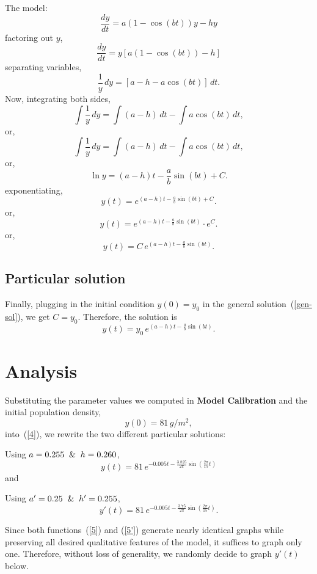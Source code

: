 \documentclass[11pt]{article}
\begin{document}
The model:
\[
\frac{dy}{dt} = a(1 - \cos(bt))y - hy
\]
factoring out $y$,
\[
\frac{dy}{dt} = y[a(1 - \cos(bt)) - h]
\]
separating variables,
\[
\frac{1}{y}\, dy = [a - h - a\cos(bt)]\, dt .
\]
Now, integrating both sides,
\[
\int \frac{1}{y}\, dy = \int (a-h)\,dt - \int a\cos(bt)\,dt,
\]
or,
\[
\int \frac{1}{y}\, dy = \int (a-h)\,dt - \int a\cos(bt)\, dt,
\]
or,
\[
\ln y = (a-h)t - \frac{a}{b}\sin(bt) + C.
\]
exponentiating,
\[
y(t)=e^{(a-h)t-\frac{a}{b}\sin(bt)+C}.
\]
or,
\[
y(t)=e^{(a-h)t-\frac{a}{b}\sin(bt)} \cdot e^C.
\]
or,
\begin{equation}
    y(t)=C\,e^{(a-h)t-\frac{a}{b}\sin(bt)}.
    \label{3}
    \tag{3}
\end{equation}

\subsection{Particular solution}

Finally, plugging in the initial condition $y(0)=y_0$ in the general solution~(\ref{gen-sol}), we get $C=y_0$. Therefore, the solution is
\begin{equation}
    y(t)=y_0\,e^{(a-h)t-\frac{a}{b}\sin(bt)}.
    \label{4}
    \tag{4}
\end{equation}

\section{Analysis}

Substituting the parameter values we computed in \textbf{Model Calibration} and the initial population density,
\[
y(0) = 81\, g/m^2,
\]
into~(\ref{4}), we rewrite the two different particular solutions:

Using $a = 0.255 \And h = 0.260$,
\begin{equation}
    y(t)=81\,e^{-0.005t-\frac{3.825}{2\pi}\sin(\frac{2\pi}{15}t)}
    \label{5}
    \tag{5}
\end{equation}
and

Using $a' = 0.25 \And h' = 0.255$,
\begin{equation}
    y'(t)=81\,e^{-0.005t-\frac{3.75}{2\pi}\sin(\frac{2\pi}{15}t)}.
    \label{5'}
    \tag{5'}
\end{equation}

Since both functions~(\ref{5}) and (\ref{5'}) generate nearly identical graphs while preserving all desired qualitative features of the model, it suffices to graph only one. Therefore, without loss of generality, we randomly decide to graph $y'(t)$ below.
\end{document}
